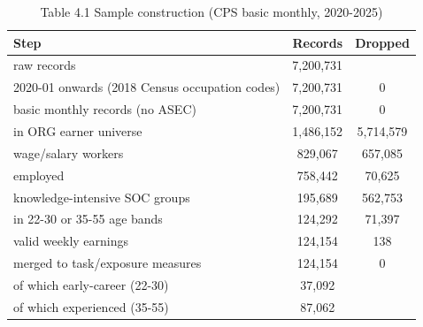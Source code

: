 \begin{table}[htbp]\centering
\caption{Table 4.1 Sample construction (CPS basic monthly, 2020-2025)}
\begin{tabular}{lcc}
\toprule
Step & Records & Dropped \\
\midrule
raw records & 7,200,731 &  \\
2020-01 onwards (2018 Census occupation codes) & 7,200,731 & 0 \\
basic monthly records (no ASEC) & 7,200,731 & 0 \\
in ORG earner universe & 1,486,152 & 5,714,579 \\
wage/salary workers & 829,067 & 657,085 \\
employed & 758,442 & 70,625 \\
knowledge-intensive SOC groups & 195,689 & 562,753 \\
in 22-30 or 35-55 age bands & 124,292 & 71,397 \\
valid weekly earnings & 124,154 & 138 \\
merged to task/exposure measures & 124,154 & 0 \\
  of which early-career (22-30) & 37,092 &  \\
  of which experienced (35-55) & 87,062 &  \\
\bottomrule
\end{tabular}
\par\vspace{2pt}{\footnotesize Counts from the step 05 sample log.}
\end{table}
